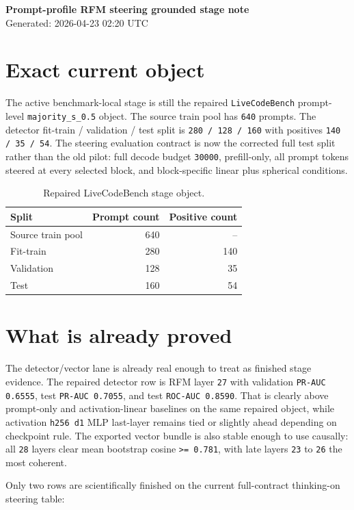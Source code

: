 \documentclass[11pt]{article}
\begin{document}
{\Large \textbf{Prompt-profile RFM steering grounded stage note}}\\
Generated: 2026-04-23 02:20 UTC

\section*{Exact current object}
The active benchmark-local stage is still the repaired \texttt{LiveCodeBench} prompt-level \texttt{majority\_s\_0.5} object. The source train pool has \texttt{640} prompts. The detector fit-train / validation / test split is \texttt{280 / 128 / 160} with positives \texttt{140 / 35 / 54}. The steering evaluation contract is now the corrected full test split rather than the old pilot: full decode budget \texttt{30000}, prefill-only, all prompt tokens steered at every selected block, and block-specific linear plus spherical conditions.

\begin{table}[h]
\centering
\begin{tabular}{lrr}
\toprule
Split & Prompt count & Positive count \\
\midrule
Source train pool & 640 & -- \\
Fit-train & 280 & 140 \\
Validation & 128 & 35 \\
Test & 160 & 54 \\
\bottomrule
\end{tabular}
\caption{Repaired LiveCodeBench stage object.}
\end{table}

\section*{What is already proved}
The detector/vector lane is already real enough to treat as finished stage evidence. The repaired detector row is RFM layer \texttt{27} with validation \texttt{PR-AUC 0.6555}, test \texttt{PR-AUC 0.7055}, and test \texttt{ROC-AUC 0.8590}. That is clearly above prompt-only and activation-linear baselines on the same repaired object, while activation \texttt{h256 d1} MLP last-layer remains tied or slightly ahead depending on checkpoint rule. The exported vector bundle is also stable enough to use causally: all \texttt{28} layers clear mean bootstrap cosine \texttt{>= 0.781}, with late layers \texttt{23} to \texttt{26} the most coherent.

Only two rows are scientifically finished on the current full-contract thinking-on steering table:
\end{document}

